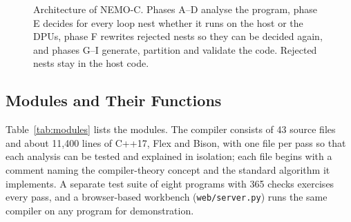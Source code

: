 \documentclass{ieeeaccess}
\begin{document}
\begin{figure}[!t]
\caption{Architecture of NEMO-C. Phases A--D analyse the program, phase E decides for every loop nest whether it runs on the host or the DPUs, phase F rewrites rejected nests so they can be decided again, and phases G--I generate, partition and validate the code. Rejected nests stay in the host code.}
\label{fig:arch}
\end{figure}

\subsection{Modules and Their Functions}
\label{sec:modules}

Table~\ref{tab:modules} lists the modules. The compiler consists of 43 source files and about 11,400 lines of C++17, Flex and Bison, with one file per pass so that each analysis can be tested and explained in isolation; each file begins with a comment naming the compiler-theory concept and the standard algorithm it implements. A separate test suite of eight programs with 365 checks exercises every pass, and a browser-based workbench (\texttt{web/server.py}) runs the same compiler on any program for demonstration.
\end{document}
